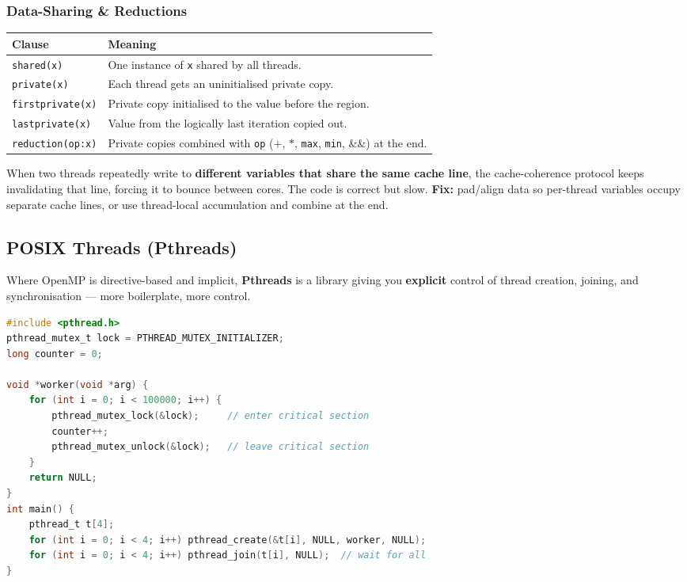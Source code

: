 \documentclass[11pt,a4paper]{article}
\begin{document}
\subsubsection{Data-Sharing \& Reductions}
\begin{longtable}{@{}p{4.0cm}p{10.0cm}@{}}
\toprule
\rowcolor{primary!15}
\textbf{Clause} & \textbf{Meaning} \\
\midrule
\endhead
\texttt{shared(x)} & One instance of \texttt{x} shared by all threads. \\
\texttt{private(x)} & Each thread gets an uninitialised private copy. \\
\texttt{firstprivate(x)} & Private copy initialised to the value before the region. \\
\texttt{lastprivate(x)} & Value from the logically last iteration copied out. \\
\texttt{reduction(op:x)} & Private copies combined with \texttt{op} ($+$, $*$, \texttt{max}, \texttt{min}, \&\&) at the end. \\
\bottomrule
\end{longtable}

\begin{alertbox}
When two threads repeatedly write to \textbf{different variables that share the same cache line}, the cache-coherence protocol keeps invalidating that line, forcing it to bounce between cores. The code is correct but slow. \textbf{Fix:} pad/align data so per-thread variables occupy separate cache lines, or use thread-local accumulation and combine at the end.
\end{alertbox}

\subsection{POSIX Threads (Pthreads)}
\begin{conceptbox}
Where OpenMP is directive-based and implicit, \textbf{Pthreads} is a library giving you \textbf{explicit} control of thread creation, joining, and synchronisation --- more boilerplate, more control.
\end{conceptbox}

\begin{examplebox}
\begin{lstlisting}[language=C]
#include <pthread.h>
pthread_mutex_t lock = PTHREAD_MUTEX_INITIALIZER;
long counter = 0;

void *worker(void *arg) {
    for (int i = 0; i < 100000; i++) {
        pthread_mutex_lock(&lock);     // enter critical section
        counter++;
        pthread_mutex_unlock(&lock);   // leave critical section
    }
    return NULL;
}
int main() {
    pthread_t t[4];
    for (int i = 0; i < 4; i++) pthread_create(&t[i], NULL, worker, NULL);
    for (int i = 0; i < 4; i++) pthread_join(t[i], NULL);  // wait for all
}
\end{lstlisting}
\end{examplebox}
\end{document}
